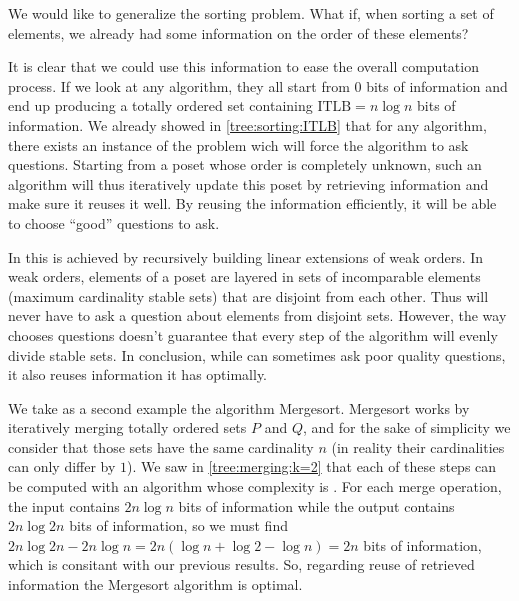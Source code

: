 
We would like to generalize the sorting problem. What if, when sorting a set of
elements, we already had some information on the order of these elements?


It is clear that we could use this information to ease the overall computation
process. If we look at any  algorithm, they all start from
$0$ bits of information and end up producing a totally ordered set containing
$\text{ITLB}= n \log n$ bits of information. We already showed in
\ref{tree:sorting:ITLB} that for any algorithm, there exists an instance of the
problem wich will force the algorithm to ask  questions.
Starting from a poset whose order is completely unknown, such an algorithm will
thus iteratively update this poset by retrieving information and make sure it
reuses it well. By reusing the information efficiently, it will be able to
choose ``good'' questions to ask.


In \quicksort this is achieved by recursively building linear extensions of weak
orders. In weak orders, elements of a poset are layered in sets of incomparable
elements (maximum cardinality stable sets) that are disjoint from each other.
Thus \quicksort will never have to ask a question about elements from disjoint
sets. However, the way \quicksort chooses questions doesn't guarantee that every
step of the algorithm will evenly divide stable sets. In conclusion, while
\quicksort can sometimes ask poor quality questions, it also reuses information
it has optimally.


We take as a second example the algorithm Mergesort. Mergesort works by
iteratively merging totally ordered sets $P$ and $Q$, and for the sake of
simplicity we consider that those sets have the same cardinality $n$  (in
reality their cardinalities can only differ by $1$). We saw in
\ref{tree:merging:k=2} that each of these steps can be computed with an
algorithm whose complexity is . For each merge operation, the input
contains $2n \log n$ bits of information while the output contains $2n \log 2n$
bits of information, so we must find $2n \log 2n - 2n \log n = 2n (\log n +
\log 2 - \log n) = 2n$ bits of information, which is consitant with our
previous results. So, regarding reuse of retrieved information the Mergesort
algorithm is optimal.

